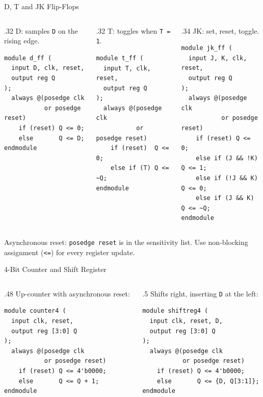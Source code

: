 \documentclass[9pt,aspectratio=169,xcolor=table]{beamer}
\begin{document}
\begin{frame}[fragile]{D, T and JK Flip-Flops}
  \begin{columns}[t]
  \begin{column}{.32\textwidth}
    \small D: samples \texttt{D} on the rising edge.
\begin{lstlisting}
module d_ff (
  input D, clk, reset,
  output reg Q
);
  always @(posedge clk
           or posedge reset)
    if (reset) Q <= 0;
    else       Q <= D;
endmodule
\end{lstlisting}
  \end{column}
  \begin{column}{.32\textwidth}
    \small T: toggles when \texttt{T = 1}.
\begin{lstlisting}
module t_ff (
  input T, clk, reset,
  output reg Q
);
  always @(posedge clk
           or posedge reset)
    if (reset)  Q <= 0;
    else if (T) Q <= ~Q;
endmodule
\end{lstlisting}
  \end{column}
  \begin{column}{.34\textwidth}
    \small JK: set, reset, toggle.
\begin{lstlisting}
module jk_ff (
  input J, K, clk, reset,
  output reg Q
);
  always @(posedge clk
           or posedge reset)
    if (reset) Q <= 0;
    else if (J && !K) Q <= 1;
    else if (!J && K) Q <= 0;
    else if (J && K)  Q <= ~Q;
endmodule
\end{lstlisting}
  \end{column}
  \end{columns}
  \vspace{2mm}
  {\small Asynchronous reset: \texttt{posedge reset} is in the sensitivity list. Use non-blocking assignment (\texttt{<=}) for every register update.}
\end{frame}

\begin{frame}[fragile]{4-Bit Counter and Shift Register}
  \begin{columns}[t]
  \begin{column}{.48\textwidth}
    \small Up-counter with asynchronous reset:
\begin{lstlisting}
module counter4 (
  input clk, reset,
  output reg [3:0] Q
);
  always @(posedge clk
           or posedge reset)
    if (reset) Q <= 4'b0000;
    else       Q <= Q + 1;
endmodule
\end{lstlisting}
  \end{column}
  \begin{column}{.5\textwidth}
    \small Shifts right, inserting \texttt{D} at the left:
\begin{lstlisting}
module shiftreg4 (
  input clk, reset, D,
  output reg [3:0] Q
);
  always @(posedge clk
           or posedge reset)
    if (reset) Q <= 4'b0000;
    else       Q <= {D, Q[3:1]};
endmodule
\end{lstlisting}
  \end{column}
  \end{columns}
\end{frame}
\end{document}
